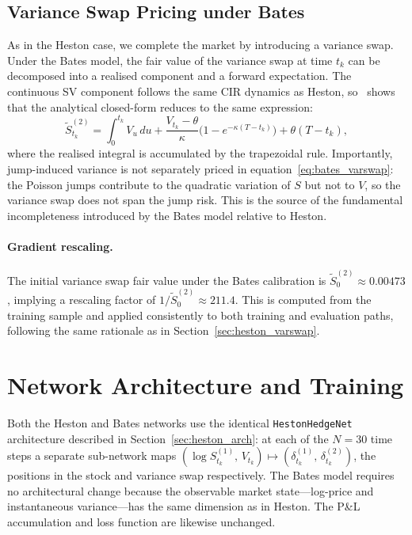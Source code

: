 \subsection{Variance Swap Pricing under Bates}
\label{sec:bates_varswap}

As in the Heston case, we complete the market by introducing a variance
swap.  Under the Bates model, the fair value of the variance swap at
time $t_k$ can be decomposed into a realised component and a forward
expectation.  The continuous SV component follows the same CIR dynamics
as Heston, so~\citet{kozyra2006} shows that the analytical closed-form
reduces to the same expression:
\begin{equation}
  \widetilde{S}_{t_k}^{(2)}
    = \int_0^{t_k} V_u\,du
    + \frac{V_{t_k} - \theta}{\kappa}
      \bigl(1 - e^{-\kappa(T - t_k)}\bigr)
    + \theta(T - t_k),
  \label{eq:bates_varswap}
\end{equation}
where the realised integral is accumulated by the trapezoidal rule.
Importantly, jump-induced variance is not separately priced in
equation~\eqref{eq:bates_varswap}: the Poisson jumps contribute to the
quadratic variation of $S$ but not to $V$, so the variance swap does not
span the jump risk.  This is the source of the fundamental incompleteness
introduced by the Bates model relative to Heston.

\paragraph{Gradient rescaling.}
The initial variance swap fair value under the Bates calibration is
$\widetilde{S}_0^{(2)} \approx 0.00473$, implying a rescaling factor
of $1/\widetilde{S}_0^{(2)} \approx 211.4$.  This is computed from the
training sample and applied consistently to both training and evaluation
paths, following the same rationale as in
Section~\ref{sec:heston_varswap}.

\section{Network Architecture and Training}
\label{sec:bates_network}

Both the Heston and Bates networks use the identical \texttt{HestonHedgeNet}
architecture described in Section~\ref{sec:heston_arch}: at each of the
$N = 30$ time steps a separate sub-network maps
$(\log S_{t_k}^{(1)},\, V_{t_k}) \mapsto
(\delta_{t_k}^{(1)},\, \delta_{t_k}^{(2)})$, the positions in the stock
and variance swap respectively.  The Bates model requires no architectural
change because the observable market state---log-price and instantaneous
variance---has the same dimension as in Heston.  The P\&L accumulation
and loss function are likewise unchanged.


